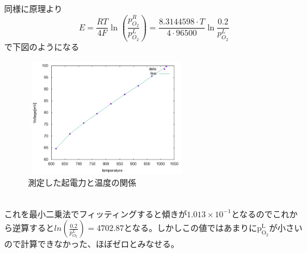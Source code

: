 \documentclass{jsarticle}
\begin{document}
\subsection{}
同様に原理より
$$
E=\frac{RT}{4F}\ln{(\frac{p_{O_2}^R}{p_{O_2}^L})}=\frac{8.3144598\cdot T}{4\cdot96500}\ln{\frac{0.2}{p_{O_2}^L}}
$$
で下図のようになる\\
\begin{figure}[htbp]
 \begin{center}
  \includegraphics[width=70mm,height=50mm]{pictures/4-2.png}
 \end{center}
 \caption{測定した起電力と温度の関係}
 \label{fig:one}
\end{figure}
\\
これを最小二乗法でフィッティングすると傾きが$1.013\times10^{-1}$となるのでこれから逆算すると$ln{(\frac{0.2}{p_{O_2}^L})}=4702.87$となる。しかしこの値ではあまりに$\mathrm{p_{O_2}^L}$が小さいので計算できなかった、ほぼゼロとみなせる。\\
\end{document}
